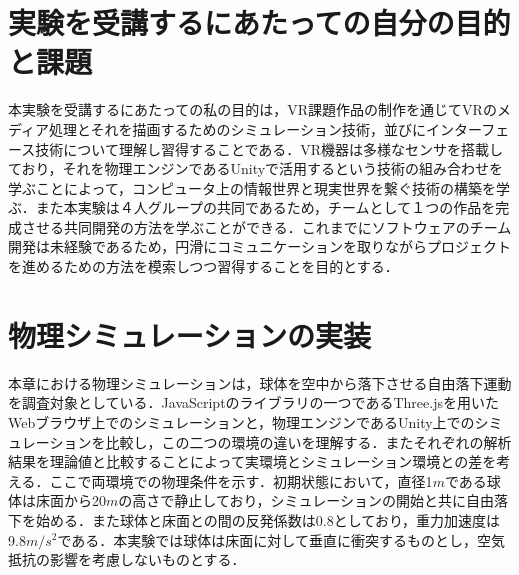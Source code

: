 \documentclass[12pt, xelatex,ja=standard,jafont=hiragino]{bxjsarticle}
\author{長谷川　瑛二} %
\newif\ifdraft
\begin{document}
\maketitle

\section{実験を受講するにあたっての自分の目的と課題}
\ifdraft
\href{https://scrapbox.io/phyexp3/VR実験の進め方}{実験の資料}
に記載した本実験全体の目的・課題を自分で解釈し、この実験を通して、自分で得たい知識と経験を``自分の目的''として設定し、その目的を達成するための課題を、``自分の言葉''で述べる。なおテキストのコピペと見られる場合は減点の対象とする。
\fi
本実験を受講するにあたっての私の目的は，VR課題作品の制作を通じてVRのメディア処理とそれを描画するためのシミュレーション技術，並びにインターフェース技術について理解し習得することである．VR機器は多様なセンサを搭載しており，それを物理エンジンであるUnityで活用するという技術の組み合わせを学ぶことによって，コンピュータ上の情報世界と現実世界を繋ぐ技術の構築を学ぶ．また本実験は４人グループの共同であるため，チームとして１つの作品を完成させる共同開発の方法を学ぶことができる．これまでにソフトウェアのチーム開発は未経験であるため，円滑にコミュニケーションを取りながらプロジェクトを進めるための方法を模索しつつ習得することを目的とする．



\section{物理シミュレーションの実装}
\ifdraft
章の冒頭で、なにを対象として物理シミュレーションするのかについて説明する。
\href{https://scrapbox.io/files/661f545b621c8200257a6a94.pdf?title=VR実験別冊テキスト.pdf}{VR実験別冊テキスト}を参考にして、物理シミュレーションの対象について、パラメータを含めて工学的に説明することが求められる。必要に応じて図を効果的に用いる。

この冒頭部分は2.1節、2.2節に共通する部分になる。すなわち、今回の実験では同じ物理現象を複数の方法を用いて実装し、それを比較するのであるから、それらで重複する部分はここに書いておく。
\fi
本章における物理シミュレーションは，球体を空中から落下させる自由落下運動を調査対象としている．JavaScriptのライブラリの一つであるThree.jsを用いたWebブラウザ上でのシミュレーションと，物理エンジンであるUnity上でのシミュレーションを比較し，この二つの環境の違いを理解する．またそれぞれの解析結果を理論値と比較することによって実環境とシミュレーション環境との差を考える．ここで両環境での物理条件を示す．初期状態において，直径1$m$である球体は床面から20$m$の高さで静止しており，シミュレーションの開始と共に自由落下を始める．また球体と床面との間の反発係数は0.8としており，重力加速度は9.8$m/s^2$である．本実験では球体は床面に対して垂直に衝突するものとし，空気抵抗の影響を考慮しないものとする．
\end{document}
